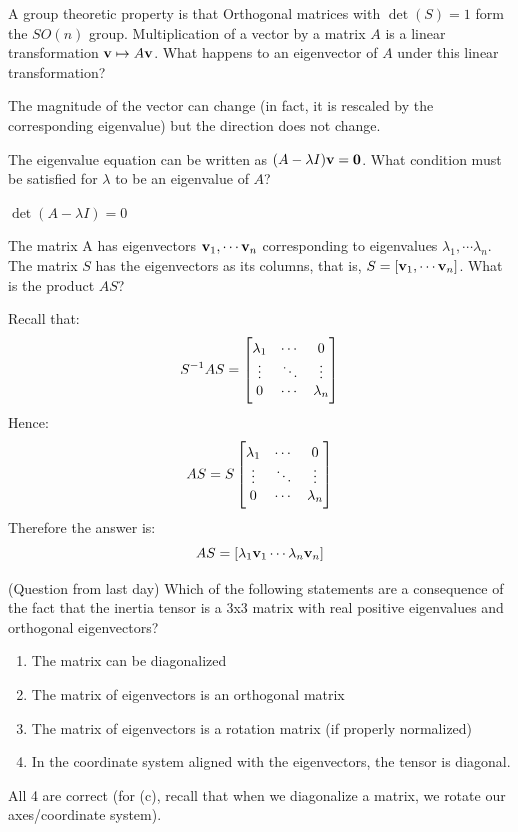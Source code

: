 \documentclass[../PHYS306Notes.tex]{subfiles}
\begin{document}
A group theoretic property is that Orthogonal matrices with $\det(S) = 1$ form the $SO(n)$ group.
\newline Multiplication of a vector by a matrix $A$ is a linear transformation $\mathbf{v} \mapsto A\mathbf{v}$. What happens to an eigenvector of $A$ under this linear transformation?
\begin{s}
The magnitude of the vector can change (in fact, it is rescaled by the corresponding eigenvalue) but the direction does not change.
\end{s}
The eigenvalue equation can be written as $(A - \lambda I)\mathbf{v} = \mathbf{0}$. What condition must be satisfied for $\lambda$ to be an eigenvalue of $A$?
\begin{s}
$\det(A - \lambda I) = 0$
\end{s}
The matrix A has eigenvectors $\mathbf{v}_1, \cdots \mathbf{v}_n$ corresponding to eigenvalues $\lambda_1, \cdots \lambda_n$. The matrix $S$ has the eigenvectors as its columns, that is, $S = [\mathbf{v}_1, \cdots \mathbf{v}_n]$. What is the product $AS$?
\begin{s}
Recall that:
\[S^{-1}AS = \begin{bmatrix}\lambda_1 &  \cdots &  0 \\ \vdots & \ddots & \vdots \\ 0 & \cdots & \lambda_n\end{bmatrix}\]
Hence:
\[AS = S\begin{bmatrix}\lambda_1 &  \cdots &  0 \\ \vdots & \ddots & \vdots \\ 0 & \cdots & \lambda_n\end{bmatrix}\]
Therefore the answer is:
\[AS = [\lambda_1 \mathbf{v}_1 \cdots \lambda_n\mathbf{v}_n]\]
\end{s}
(Question from last day) Which of the following statements are a consequence of the fact that the inertia tensor is a 3x3 matrix with real positive eigenvalues and orthogonal eigenvectors?
\begin{enumerate}
    \item The matrix can be diagonalized
    \item The matrix of eigenvectors is an orthogonal matrix
    \item The matrix of eigenvectors is a rotation matrix (if properly normalized)
    \item In the coordinate system aligned with the eigenvectors, the tensor is diagonal.
\end{enumerate}
\begin{s}
    All 4 are correct (for (c), recall that when we diagonalize a matrix, we rotate our axes/coordinate system). 
\end{s}
\end{document}
